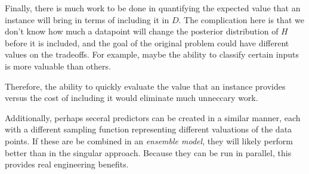 \documentclass[twoside]{article}
\begin{document}
Finally, there is much work to be done in quantifying the expected value that an instance will bring in terms of including it in \(D\). The complication here is that we don't know how much a datapoint will change the posterior distribution of \(H\) before it is included, and the goal of the original problem could have different values on the tradeoffs. For example, maybe the ability to classify certain inputs is more valuable than others.

Therefore, the ability to quickly evaluate the value that an instance provides versus the cost of including it would eliminate much unneccary work.

Additionally, perhaps seceral predictors can be created in a similar manner, each with a different sampling function representing different valuations of the data points. If these are be combined in an \textit{ensemble model}, they will likely perform better than in the singular approach. Because they can be run in parallel, this provides real engineering benefits.
\end{document}
